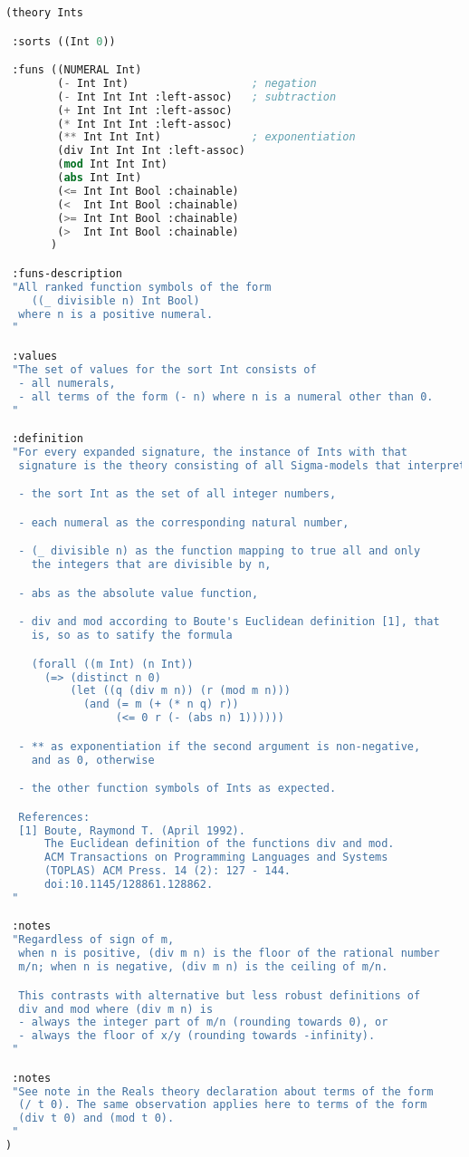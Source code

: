 \documentclass{article}
\begin{document}
\begin{lstlisting}[language=Lisp]
(theory Ints

 :sorts ((Int 0))

 :funs ((NUMERAL Int)
        (- Int Int)                   ; negation
        (- Int Int Int :left-assoc)   ; subtraction
        (+ Int Int Int :left-assoc)
        (* Int Int Int :left-assoc)
        (** Int Int Int)              ; exponentiation
        (div Int Int Int :left-assoc)
        (mod Int Int Int)
        (abs Int Int)
        (<= Int Int Bool :chainable)
        (<  Int Int Bool :chainable)
        (>= Int Int Bool :chainable)
        (>  Int Int Bool :chainable)
       )

 :funs-description
 "All ranked function symbols of the form
    ((_ divisible n) Int Bool)
  where n is a positive numeral.
 "

 :values
 "The set of values for the sort Int consists of
  - all numerals,
  - all terms of the form (- n) where n is a numeral other than 0.
 "

 :definition
 "For every expanded signature, the instance of Ints with that
  signature is the theory consisting of all Sigma-models that interpret:

  - the sort Int as the set of all integer numbers,

  - each numeral as the corresponding natural number,

  - (_ divisible n) as the function mapping to true all and only
    the integers that are divisible by n,

  - abs as the absolute value function,

  - div and mod according to Boute's Euclidean definition [1], that
    is, so as to satify the formula

    (forall ((m Int) (n Int))
      (=> (distinct n 0)
          (let ((q (div m n)) (r (mod m n)))
            (and (= m (+ (* n q) r))
                 (<= 0 r (- (abs n) 1))))))

  - ** as exponentiation if the second argument is non-negative,
    and as 0, otherwise

  - the other function symbols of Ints as expected.

  References:
  [1] Boute, Raymond T. (April 1992).
      The Euclidean definition of the functions div and mod.
      ACM Transactions on Programming Languages and Systems
      (TOPLAS) ACM Press. 14 (2): 127 - 144.
      doi:10.1145/128861.128862.
 "

 :notes
 "Regardless of sign of m,
  when n is positive, (div m n) is the floor of the rational number
  m/n; when n is negative, (div m n) is the ceiling of m/n.

  This contrasts with alternative but less robust definitions of
  div and mod where (div m n) is
  - always the integer part of m/n (rounding towards 0), or
  - always the floor of x/y (rounding towards -infinity).
 "

 :notes
 "See note in the Reals theory declaration about terms of the form
  (/ t 0). The same observation applies here to terms of the form
  (div t 0) and (mod t 0).
 "
)

\end{lstlisting}
\end{document}
